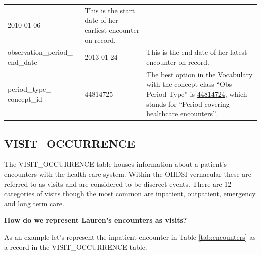 \documentclass[11pt]{book}
\begin{document}
\begin{longtable}[]{@{}lll@{}}
\begin{minipage}[t]{0.16\columnwidth}
2010-01-06\strut
\end{minipage} & \begin{minipage}[t]{0.48\columnwidth}\raggedright\strut
This is the start date of her earliest encounter on record.\strut
\end{minipage}\tabularnewline
\begin{minipage}[t]{0.28\columnwidth}\raggedright\strut
observation\_period\_ end\_date\strut
\end{minipage} & \begin{minipage}[t]{0.16\columnwidth}\raggedright\strut
2013-01-24\strut
\end{minipage} & \begin{minipage}[t]{0.48\columnwidth}\raggedright\strut
This is the end date of her latest encounter on record.\strut
\end{minipage}\tabularnewline
\begin{minipage}[t]{0.28\columnwidth}\raggedright\strut
period\_type\_ concept\_id\strut
\end{minipage} & \begin{minipage}[t]{0.16\columnwidth}\raggedright\strut
44814725\strut
\end{minipage} & \begin{minipage}[t]{0.48\columnwidth}\raggedright\strut
The best option in the Vocabulary with the concept class ``Obs Period
Type'' is
\href{http://athena.ohdsi.org/search-terms/terms/44814724}{44814724},
which stands for ``Period covering healthcare encounters''.\strut
\end{minipage}\tabularnewline
\bottomrule
\end{longtable}

\subsection{VISIT\_OCCURRENCE}\label{visitOccurrence}

The VISIT\_OCCURRENCE table houses information about a patient's
encounters with the health care system. Within the OHDSI vernacular
these are referred to as visits and are considered to be discreet
events. There are 12 categories of visits though the most common are
inpatient, outpatient, emergency and long term care.

\textbf{How do we represent Lauren's encounters as visits?}

As an example let's represent the inpatient encounter in Table
\ref{tab:encounters} as a record in the VISIT\_OCCURRENCE table.
\end{document}
